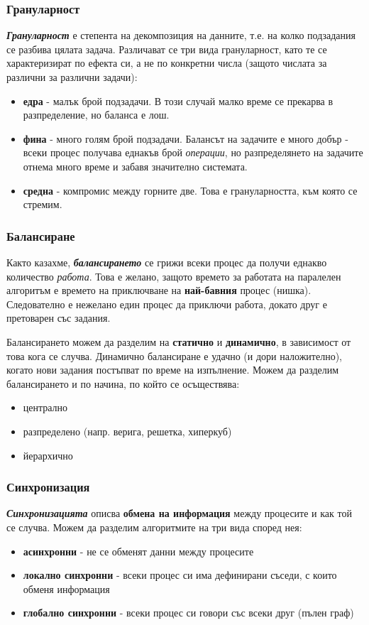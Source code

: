 \documentclass[fleqn,12pt]{article}
\begin{document}
\subsubsection{Грануларност}
\textbf{\textit{Грануларност}} е степента на декомпозиция на данните, т.е. на колко подзадания се разбива цялата задача.
Различават се три вида грануларност, като те се характеризират по ефекта си, а не по конкретни числа (защото 
числата за различни за различни задачи):
\begin{itemize}
    \item \textbf{едра} - малък брой подзадачи. В този случай малко време се прекарва в разпределение, но баланса е лош.
    \item \textbf{фина} - много голям брой подзадачи. Балансът на задачите е много добър - всеки процес получава еднакъв брой 
    \textit{операции}, но разпределянето на задачите отнема много време и забавя значително системата.
    \item \textbf{средна} - компромис между горните две. Това е грануларността, към която се стремим.
\end{itemize}

\subsubsection{Балансиране}
Както казахме, \textbf{\textit{балансирането}} се грижи всеки процес да получи еднакво количество \textit{работа}.
Това е желано, защото времето за работата на паралелен алгоритъм е времето на приключване на \textbf{най-бавния} процес (нишка).
Следователно е нежелано един процес да приключи работа, докато друг е претоварен със задания.

Балансирането можем да разделим на \textbf{статично} и \textbf{динамично}, в зависимост от това кога се случва.
Динамично балансиране е удачно (и дори наложително), когато нови задания постъпват по време на изпълнение.
Можем да разделим балансирането и по начина, по който се осъществява:
\begin{itemize}
    \item централно 
    \item разпределено (напр. верига, решетка, хиперкуб)
    \item йерархично
\end{itemize}

\subsubsection{Синхронизация}
\textbf{\textit{Синхронизацията}} описва \textbf{обмена на информация} между процесите и как той се случва.
Можем да разделим алгоритмите на три вида според нея:
\begin{itemize}
    \item \textbf{асинхронни} - не се обменят данни между процесите
    \item \textbf{локално синхронни} - всеки процес си има дефинирани съседи, с които обменя информация
    \item \textbf{глобално синхронни} - всеки процес си говори със всеки друг (пълен граф)
\end{itemize}
\end{document}
